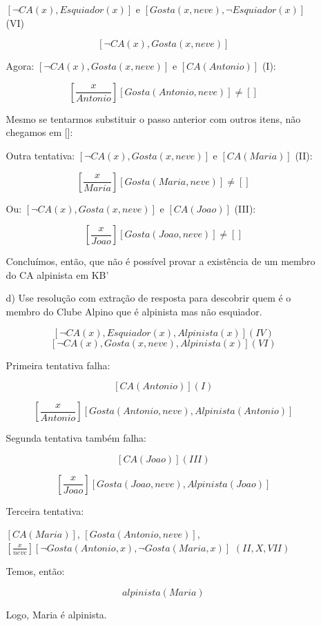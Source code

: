 \documentclass{article}
\begin{document}
\begin{enumerate}
\begin{itemize}
        $[\neg CA(x), Esquiador(x)]$ e $[Gosta(x, neve), \neg Esquiador (x)]$ (VI)

        $$[\neg CA(x), Gosta(x, neve)]$$

        Agora: $[\neg CA(x), Gosta(x, neve)]$ e $[CA (Antonio)]$ (I):

        $$\left[\frac{x}{Antonio}\right][Gosta(Antonio, neve)] \neq []$$

        Mesmo se tentarmos substituir o passo anterior com outros itens, 
        não chegamos em []:

        Outra tentativa: $[\neg CA(x), Gosta(x, neve)]$ e $[CA (Maria)]$ (II):

        $$\left[\frac{x}{Maria}\right][Gosta(Maria, neve)] \neq []$$

        Ou: $[\neg CA(x), Gosta(x, neve)]$ e $[CA (Joao)]$ (III):

        $$\left[\frac{x}{Joao}\right][Gosta(Joao, neve)] \neq []$$

        Concluímos, então, que não é possível provar a existência de um
        membro do CA alpinista em KB'

        \item [d)] Use resolução com extração de resposta para descobrir quem é o membro do Clube
        Alpino que é alpinista mas não esquiador.

        $$[\neg CA(x), Esquiador(x), Alpinista(x)] (IV)$$
        $$[\neg CA(x), Gosta(x, neve), Alpinista(x)] (VI)$$

        Primeira tentativa falha:

        $$[CA (Antonio)] (I)$$

        $$\left[\frac{x}{Antonio}\right][Gosta(Antonio, neve), Alpinista(Antonio)]$$

        Segunda tentativa também falha:

        $$[CA (Joao)] (III)$$

        $$\left[\frac{x}{Joao}\right][Gosta(Joao, neve), Alpinista(Joao)]$$

        Terceira tentativa:

        $[CA (Maria)]$, $[Gosta(Antonio, neve)]$, $\left[\frac{x}{neve}\right][\neg Gosta (Antonio,x), \neg Gosta (Maria,x)]$  $(II, X, VII)$

        Temos, então:

        $$alpinista(Maria)$$

        Logo, Maria é alpinista.

    \end{itemize}


\end{enumerate}
\end{document}
